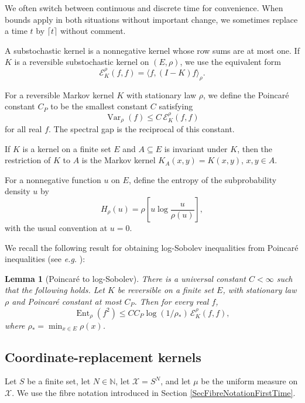 \documentclass[11pt, reqno]{amsart}
\numberwithin{equation}{section}
\newtheorem{lemma}[theorem]{Lemma}
\newcommand{\Ent}{\operatorname{Ent}}
\newcommand{\Var}{\operatorname{Var}}
\newcommand{\cE}{\mathcal E}
\begin{document}
We often switch between continuous and discrete time for convenience. When bounds apply in both situations without important change, we sometimes replace a time $t$ by $\lceil t \rceil$ without comment.

A substochastic kernel is a nonnegative kernel whose row sums are at most one. If
\(K\) is a reversible substochastic kernel on \((E,\rho)\), we use the
equivalent form
\[
    \cE_K^\rho(f,f)=\langle f,(I-K)f\rangle_\rho.
\]

For a reversible Markov kernel \(K\) with stationary law \(\rho\), we define the
Poincar\'e constant \(C_P\) to be the smallest constant $C$ satisfying
\[
\Var_\rho(f)\le C\,\cE_K^\rho(f,f)
\]
for all real \(f\). The spectral gap is the reciprocal of this constant.

If \(K\) is a kernel on a finite set \(E\) and \(A\subseteq E\) is invariant under \(K\), then the restriction of \(K\) to \(A\) is the Markov kernel \(K_A(x,y)=K(x,y)\), \(x,y\in A\).

For a nonnegative function \(u\) on \(E\), define the entropy of the
subprobability density \(u\) by
\[
    H_\rho(u)=\rho\left[u\log\frac{u}{\rho(u)}\right],
\]
with the usual convention at \(u=0\).

We recall the following result for obtaining log-Sobolev inequalities from Poincar\'e inequalities (see \textit{e.g.} \cite{DiaconisSaloffCoste1996LSI}):

\begin{lemma}[Poincar\'e to log-Sobolev]\label{lem:abstract-gap-lsi} There is a universal constant $C < \infty$ such that the following holds.
Let \(K\) be reversible on a finite set \(E\), with stationary law \(\rho\) and
Poincar\'e constant at most \(C_P\).  Then for every real \(f\),
\[
    \Ent_\rho(f^2)\le C C_P\log(1/\rho_*)\,\cE_K^\rho(f,f),
\]
where $\rho_*=\min_{x\in E}\rho(x)$.
\end{lemma}

\subsection{Coordinate-replacement kernels}\label{subsec:coordinate-replacement}


Let \(S\) be a finite set, let $N \in \mathbb{N}$, let $\mathcal X=S^N$, and let $\mu$ be the uniform measure on $\mathcal X$. We use the fibre notation introduced in Section \ref{SecFibreNotationFirstTime}.
\end{document}
